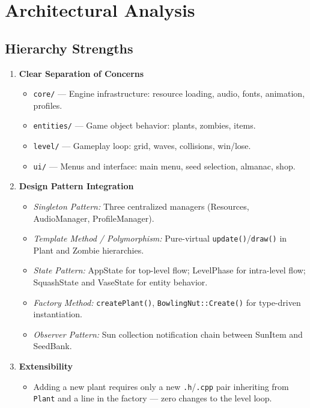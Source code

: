\documentclass[12pt,a4paper]{article}
\begin{document}
\section{Architectural Analysis}
\subsection{Hierarchy Strengths}
\begin{enumerate}[leftmargin=2em]
    \item \textbf{Clear Separation of Concerns}
    \begin{itemize}
        \item \texttt{core/} --- Engine infrastructure: resource loading, audio, fonts, animation, profiles.
        \item \texttt{entities/} --- Game object behavior: plants, zombies, items.
        \item \texttt{level/} --- Gameplay loop: grid, waves, collisions, win/lose.
        \item \texttt{ui/} --- Menus and interface: main menu, seed selection, almanac, shop.
    \end{itemize}
    \item \textbf{Design Pattern Integration}
    \begin{itemize}
        \item \textit{Singleton Pattern:} Three centralized managers (Resources, AudioManager, ProfileManager).
        \item \textit{Template Method / Polymorphism:} Pure-virtual \texttt{update}\texttt{()}/\texttt{draw}\texttt{()} in Plant and Zombie hierarchies.
        \item \textit{State Pattern:} AppState for top-level flow; LevelPhase for intra-level flow; SquashState and VaseState for entity behavior.
        \item \textit{Factory Method:} \texttt{createPlant}\texttt{()}, \texttt{BowlingNut::Create}\texttt{()} for type-driven instantiation.
        \item \textit{Observer Pattern:} Sun collection notification chain between SunItem and SeedBank.
    \end{itemize}
    \item \textbf{Extensibility}
    \begin{itemize}
        \item Adding a new plant requires only a new \texttt{.h}/\texttt{.cpp} pair inheriting from \texttt{Plant} and a line in the factory --- zero changes to the level loop.

\end{itemize}
\end{enumerate}
\end{document}
